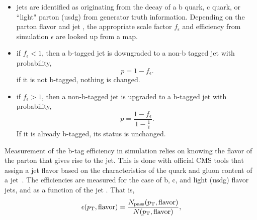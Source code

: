 \begin{itemize}

    \item jets are identified as originating from the decay of a b quark, c quark, or ``light" parton (usdg) from generator truth information. Depending on the parton flavor and jet \pt, the appropriate scale factor $f_{\epsilon}$ and efficiency from simulation $\epsilon$ are looked up from a map.
    
    \item if $f_{\epsilon} < 1$, then a b-tagged jet is downgraded to a non-b tagged jet with probability,
        \begin{equation}
            p = 1 - f_{\epsilon}.
        \end{equation}
        \noindent if it is not b-tagged, nothing is changed.
    
    
    \item if $f_{\epsilon} > 1$, then a non-b-tagged jet is upgraded to a b-tagged jet with probability,
        \begin{equation}
            p = \frac{1 - f_{\epsilon}}{1 - \frac{1}{\epsilon}}.
        \end{equation}
        \noindent If it is already b-tagged, its status is unchanged.
\end{itemize}


Measurement of the b-tag efficiency in simulation relies on knowing the flavor of the parton that gives rise to the jet.  This is done with official CMS tools that assign a jet flavor based on the characteristics of the quark and gluon content of a jet~\cite{twiki:jet_mc_flavor}.  The efficiencies are measured for the case of b, c, and light (usdg) flavor jets, and as a function of the jet \pt.  That is,
\begin{equation}
    \epsilon(p_{\mathrm{T}}, \mathrm{flavor}) = \frac{ N_{\mathrm{pass}}(p_{\mathrm{T}}, \mathrm{flavor})} {N(p_{\mathrm{T}}, \mathrm{flavor})},
\end{equation}

